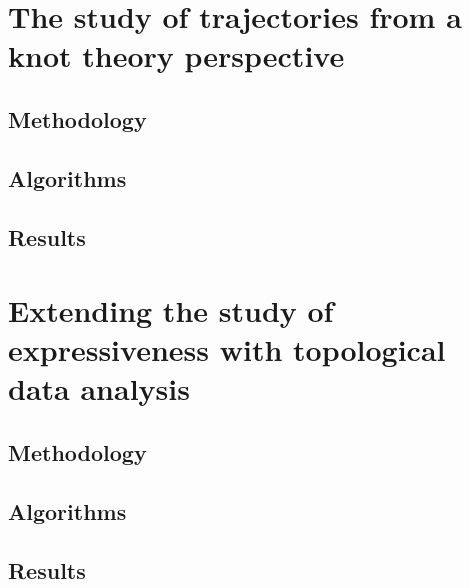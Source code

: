 \documentclass[12pt, a4paper]{article}
\begin{document}
\newpage
\thispagestyle{empty}
\mbox{}
\newpage

\section{The study of trajectories from a knot theory perspective}

\subsection{Methodology}

\subsection{Algorithms}

\subsection{Results}

\newpage
\thispagestyle{empty}
\mbox{}
\newpage

\section{Extending the study of expressiveness with topological data analysis} 
\subsection{Methodology}

\subsection{Algorithms}

\subsection{Results}

\newpage
\thispagestyle{empty}
\mbox{}
\newpage




\end{document}
